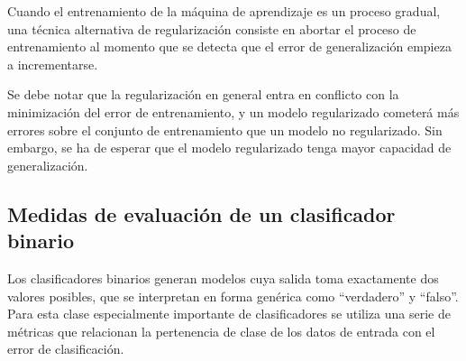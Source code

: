 Cuando el entrenamiento de la máquina de aprendizaje es un proceso
gradual, una técnica alternativa de regularización consiste en
abortar el proceso de entrenamiento al momento que se detecta
que el error de generalización empieza a incrementarse.

Se debe notar que la regularización en general entra en conflicto con
la minimización del error de entrenamiento, y un modelo regularizado
cometerá más errores sobre el conjunto de entrenamiento que un modelo
no regularizado.  Sin embargo, se ha de esperar que el modelo
regularizado tenga mayor capacidad de generalización.
%
%
\subsection{Medidas de evaluación de un clasificador binario}
%
Los clasificadores binarios generan modelos cuya salida toma
exactamente dos valores posibles, que se interpretan en forma genérica
como ``verdadero'' y ``falso''. Para esta clase especialmente
importante de clasificadores se utiliza una serie de métricas que
relacionan la pertenencia de clase de los datos de entrada con el
error de clasificación.

